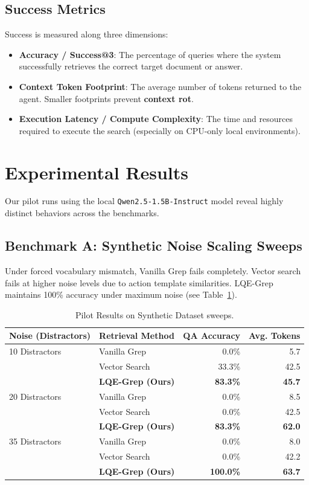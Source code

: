 \documentclass[11pt,a4paper]{article}
\begin{document}
\subsection{Success Metrics}
Success is measured along three dimensions:
\begin{itemize}
    \item \textbf{Accuracy / Success@3}: The percentage of queries where the system successfully retrieves the correct target document or answer.
    \item \textbf{Context Token Footprint}: The average number of tokens returned to the agent. Smaller footprints prevent \textbf{context rot}.
    \item \textbf{Execution Latency / Compute Complexity}: The time and resources required to execute the search (especially on CPU-only local environments).
\end{itemize}

\section{Experimental Results}
Our pilot runs using the local \texttt{Qwen2.5-1.5B-Instruct} model reveal highly distinct behaviors across the benchmarks.

\subsection{Benchmark A: Synthetic Noise Scaling Sweeps}
Under forced vocabulary mismatch, Vanilla Grep fails completely. Vector search fails at higher noise levels due to action template similarities. LQE-Grep maintains 100\% accuracy under maximum noise (see Table~\ref{tab:synthetic_results}).

\begin{table}[h]
\centering
\caption{Pilot Results on Synthetic Dataset sweeps.}
\label{tab:synthetic_results}
\begin{tabular}{llrr}
\toprule
\textbf{Noise (Distractors)} & \textbf{Retrieval Method} & \textbf{QA Accuracy} & \textbf{Avg. Tokens} \\
\midrule
10 Distractors & Vanilla Grep & 0.0\% & 5.7 \\
               & Vector Search & 33.3\% & 42.5 \\
               & \textbf{LQE-Grep (Ours)} & \textbf{83.3\%} & \textbf{45.7} \\
\midrule
20 Distractors & Vanilla Grep & 0.0\% & 8.5 \\
               & Vector Search & 0.0\% & 42.5 \\
               & \textbf{LQE-Grep (Ours)} & \textbf{83.3\%} & \textbf{62.0} \\
\midrule
35 Distractors & Vanilla Grep & 0.0\% & 8.0 \\
               & Vector Search & 0.0\% & 42.2 \\
               & \textbf{LQE-Grep (Ours)} & \textbf{100.0\%} & \textbf{63.7} \\
\bottomrule
\end{tabular}
\end{table}
\end{document}
